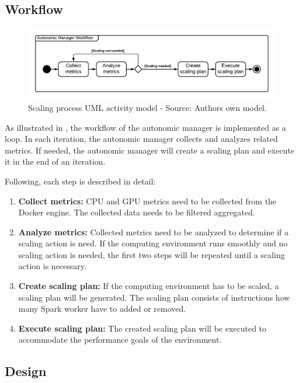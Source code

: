 \subsection{Workflow}
\begin{figure}[h]%
\centering
\includegraphics[scale=0.65]{images/04_conceptual_design/autonomic_manager/autonomic_manager_workflow}%
\caption{Scaling process UML activity model - Source: Authors own model.}%
\label{fig:am-workflow}%
\end{figure}

As illustrated in , the workflow of the autonomic manager is implemented as a loop. In each iteration, the autonomic manager collects and analyzes related metrics. If needed, the autonomic manager will create a scaling plan and execute it in the end of an iteration.


Following, each step is described in detail:

\begin{enumerate}
\item \textbf{Collect metrics:} CPU and GPU metrics need to be collected from the Docker engine. The collected data needs to be filtered aggregated.
\item \textbf{Analyze metrics:} Collected metrics need to be analyzed to determine if a scaling action is need. If the computing environment runs smoothly and no scaling action is needed, the first two steps will be repeated until a scaling action is necessary.
\item \textbf{Create scaling plan:} If the computing environment has to be scaled, a scaling plan will be generated. The scaling plan consists of instructions how many Spark worker have to added or removed.
\item \textbf{Execute scaling plan:} The created scaling plan will be executed to accommodate the performance goals of the environment.
\end{enumerate}


\subsection{Design}

